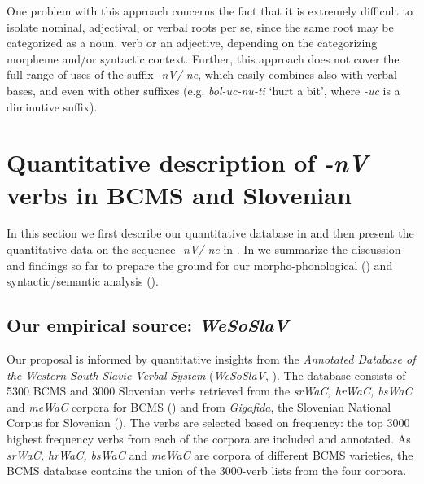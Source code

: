 \documentclass[output=paper,colorlinks,citecolor=brown]{langscibook}
\begin{document}
One problem with this approach concerns the fact that it is extremely difficult to isolate nominal, adjectival, or verbal roots per se, since the same root may be categorized as a noun, verb or an adjective, depending on the categorizing morpheme and/or syntactic context. Further, this approach does not cover the full range of uses of the suffix \textit{-nV/-ne}, which easily combines also with verbal bases, and even with other suffixes (e.g. \textit{bol-uc-nu-ti} `hurt a bit', where \textit{-uc} is a diminutive suffix).

\section{Quantitative description of \textit{-nV} verbs in BCMS and Slovenian} \label{str:sect:Quantitative description}

In this section we first describe our quantitative database in  and then present the quantitative data on the sequence \textit{-nV/-ne} in . In  we summarize the discussion and findings so far to prepare the ground for our morpho-phonological () and syntactic/semantic analysis (). 

\subsection{Our empirical source: \textit{WeSoSlaV}} \label{str:subsect:WeSoSlaV}

Our proposal is informed by quantitative insights from the \textit{Annotated Database of the Western South Slavic Verbal System} (\textit{WeSoSlaV}, \citealt{database_Lanko, WeSoSlaV_derivation, database_Boban}). %
The database consists of 5300 BCMS and 3000 Slovenian verbs retrieved from the \textit{srWaC, hrWaC, bsWaC} and \textit{meWaC} corpora for BCMS (\citealt{LjubesicKlubicka2014}) and from \textit{Gigafida}, the Slovenian National Corpus for Slovenian (\citealt{Logar-BergincEgAl2012}). The verbs are selected based on frequency: the top 3000 highest frequency verbs from each of the corpora are included and annotated. As \textit{srWaC, hrWaC, bsWaC} and \textit{meWaC} are corpora of different BCMS varieties, the BCMS database contains the union of the 3000-verb lists from the four corpora. 
\end{document}
